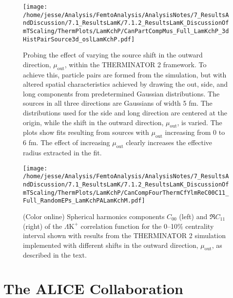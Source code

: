 \documentclass[ALICE,manyauthors]{cernphprep}
\newcommand{\LamKchP}{$\Lambda\mathrm{K^{+}}$\xspace}
\begin{document}
\begin{figure}[h]
  \centering
  \texttt{[image: /home/jesse/Analysis/FemtoAnalysis/AnalysisNotes/7\_ResultsAndDiscussion/7.1\_ResultsLamK/7.1.2\_ResultsLamK\_DiscussionOfmTScaling/ThermPlots/LamKchP/CanPartCompMus\_Full\_LamKchP\_3dHistPairSource3d\_oslLamKchP.pdf]}
  \caption[Varying $\mu_{\mathrm{Out}}$ with THERMINATOR 2]
  {
  Probing the effect of varying the source shift in the outward direction, $\mu_{\mathrm{out}}$, within the THERMINATOR 2 framework.  
  To achieve this, particle pairs are formed from the simulation, but with altered spatial characteristics achieved by drawing the out, side, and long components from predetermined Gaussian distributions.  
  The sources in all three directions are Gaussians of width 5 fm.
  The distributions used for the side and long direction are centered at the origin, while the shift in the outward direction, $\mu_{\mathrm{out}}$, is varied.
  The plots show fits resulting from sources with $\mu_{\mathrm{out}}$ increasing from 0 to 6 fm. 
  The effect of increasing $\mu_{\mathrm{out}}$ clearly increases the effective radius extracted in the fit.
  }
  \label{fig:LamKchP_ThermSources_VaryMuOut}
\end{figure}



\begin{figure}[h]
  \centering
  \texttt{[image: /home/jesse/Analysis/FemtoAnalysis/AnalysisNotes/7\_ResultsAndDiscussion/7.1\_ResultsLamK/7.1.2\_ResultsLamK\_DiscussionOfmTScaling/ThermPlots/LamKchP/CanCompFourThermCfYlmReC00C11\_Full\_RandomEPs\_LamKchPALamKchM.pdf]}
  \caption[\LamKchP $C_{00}$ and $\Re C_{11}$ Spherical Harmonic Components (0--10\%) with THERMINATOR 2 ($b = 2$ fm]
  {
  (Color online) Spherical harmonics components $C_{00}$ (left) and $\Re C_{11}$ (right) of the \LamKchP correlation function for the 0--10\% centrality interval shown with results from the THERMINATOR 2 simulation implemented with different shifts in the outward direction, $\mu_{\mathrm{out}}$, as described in the text.
  }
  \label{fig:LamKchP_ThermSources_VaryMuOut_SH}
\end{figure}






\clearpage


\section{The ALICE Collaboration}
\label{app:collab}
\end{document}
